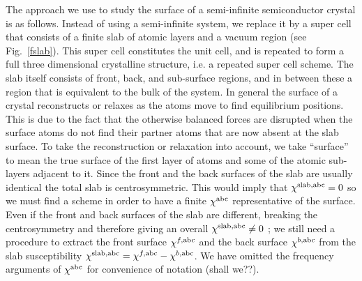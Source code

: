 \documentclass[floatfix,prb,aps,superscriptaddress,11pt,preprint,letterpaper]{revtex4}
\def\chon{black}
\begin{document}

The approach we use to study the surface of a semi-infinite
semiconductor crystal is as follows. Instead of using a
semi-infinite system, we replace it by a super cell that 
{\color{\chon} consists} of a finite
slab of atomic layers and a vacuum region (see Fig.~\ref{fslab}). This
super cell {\color{\chon} constitutes the unit cell, and}
is repeated to form a full three dimensional crystalline structure,
i.e. a repeated super cell scheme. 
The slab itself consists of {\color{\chon} front, back, and 
sub-surface} regions, and in between these
a region that is equivalent to {\color{\chon} the}
bulk of the system. 
In general the surface of a crystal reconstructs or relaxes as the atoms
move to find equilibrium positions. This is due to the fact that
the otherwise
balanced forces are disrupted when the surface atoms do not find their 
partner atoms that are now absent at the {\color{\chon} slab surface.} 
To take the reconstruction or relaxation into account, 
we take ``surface'' to mean
the true surface of the first layer of {\color{\chon} atoms} and
some of the atomic sub-layers adjacent to it.
Since the front and the back
surfaces of the slab are usually identical the total slab is
centrosymmetric. This would imply that 
$\chi^{\mathrm{slab},\mathrm{a}\mathrm{b}\mathrm{c}}=0$ {\color{\chon} so} we must
find a scheme 
in order to have a finite $\chi^{\mathrm{a}\mathrm{b}\mathrm{c}}$ representative of the
surface. Even if the front and back surfaces of the slab 
are different, breaking the centrosymmetry and therefore giving an
overall $\chi^{\mathrm{slab},\mathrm{a}\mathrm{b}\mathrm{c}}\ne 0${\color{\chon} ;} we still
need a procedure to extract the front surface $\chi^{f,\mathrm{a}\mathrm{b}\mathrm{c}}$
and the back surface $\chi^{b,\mathrm{a}\mathrm{b}\mathrm{c}}$ from the slab
susceptibility 
$\chi^{\mathrm{slab},\mathrm{a}\mathrm{b}\mathrm{c}}=\chi^{f,\mathrm{a}\mathrm{b}\mathrm{c}}-\chi^{b,\mathrm{a}\mathrm{b}\mathrm{c}}$.
We have omitted the frequency arguments of $\chi^{\mathrm{a}\mathrm{b}\mathrm{c}}$ for 
{\color{\chon} convenience of} notation ({\color{blue}shall we??}). 
\end{document}

